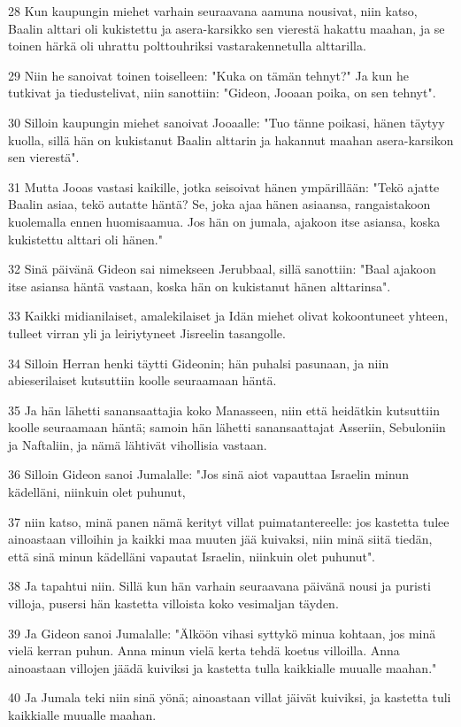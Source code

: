 \par 28 Kun kaupungin miehet varhain seuraavana aamuna nousivat, niin katso, Baalin alttari oli kukistettu ja asera-karsikko sen vierestä hakattu maahan, ja se toinen härkä oli uhrattu polttouhriksi vastarakennetulla alttarilla.
\par 29 Niin he sanoivat toinen toiselleen: "Kuka on tämän tehnyt?" Ja kun he tutkivat ja tiedustelivat, niin sanottiin: "Gideon, Jooaan poika, on sen tehnyt".
\par 30 Silloin kaupungin miehet sanoivat Jooaalle: "Tuo tänne poikasi, hänen täytyy kuolla, sillä hän on kukistanut Baalin alttarin ja hakannut maahan asera-karsikon sen vierestä".
\par 31 Mutta Jooas vastasi kaikille, jotka seisoivat hänen ympärillään: "Tekö ajatte Baalin asiaa, tekö autatte häntä? Se, joka ajaa hänen asiaansa, rangaistakoon kuolemalla ennen huomisaamua. Jos hän on jumala, ajakoon itse asiansa, koska kukistettu alttari oli hänen."
\par 32 Sinä päivänä Gideon sai nimekseen Jerubbaal, sillä sanottiin: "Baal ajakoon itse asiansa häntä vastaan, koska hän on kukistanut hänen alttarinsa".
\par 33 Kaikki midianilaiset, amalekilaiset ja Idän miehet olivat kokoontuneet yhteen, tulleet virran yli ja leiriytyneet Jisreelin tasangolle.
\par 34 Silloin Herran henki täytti Gideonin; hän puhalsi pasunaan, ja niin abieserilaiset kutsuttiin koolle seuraamaan häntä.
\par 35 Ja hän lähetti sanansaattajia koko Manasseen, niin että heidätkin kutsuttiin koolle seuraamaan häntä; samoin hän lähetti sanansaattajat Asseriin, Sebuloniin ja Naftaliin, ja nämä lähtivät vihollisia vastaan.
\par 36 Silloin Gideon sanoi Jumalalle: "Jos sinä aiot vapauttaa Israelin minun kädelläni, niinkuin olet puhunut,
\par 37 niin katso, minä panen nämä kerityt villat puimatantereelle: jos kastetta tulee ainoastaan villoihin ja kaikki maa muuten jää kuivaksi, niin minä siitä tiedän, että sinä minun kädelläni vapautat Israelin, niinkuin olet puhunut".
\par 38 Ja tapahtui niin. Sillä kun hän varhain seuraavana päivänä nousi ja puristi villoja, pusersi hän kastetta villoista koko vesimaljan täyden.
\par 39 Ja Gideon sanoi Jumalalle: "Älköön vihasi syttykö minua kohtaan, jos minä vielä kerran puhun. Anna minun vielä kerta tehdä koetus villoilla. Anna ainoastaan villojen jäädä kuiviksi ja kastetta tulla kaikkialle muualle maahan."
\par 40 Ja Jumala teki niin sinä yönä; ainoastaan villat jäivät kuiviksi, ja kastetta tuli kaikkialle muualle maahan.

